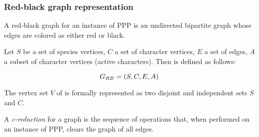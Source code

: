 \subsubsection{Red-black graph representation}\label{sssec:grb}

A red-black graph for an instance of PPP is an undirected bipartite graph whose edges are colored as either red or black.

\begin{definition}\label{def:grb}
  Let $S$ be a set of species vertices, $C$ a set of character vertices, $E$ a set of edges, $A$ a subset of character vertices (active characters).
  Then \grb{} is defined as follows:

  \[ G_{RB}{} = (S, C, E, A) \]

  The vertex set $V$ of \grb{} is formally represented as two disjoint and independent sets $S$ and $C$.
\end{definition}


A \emph{c-reduction} for a graph \grb{} is the sequence of operations that, when performed on an instance of PPP, clears the graph of all edges.
